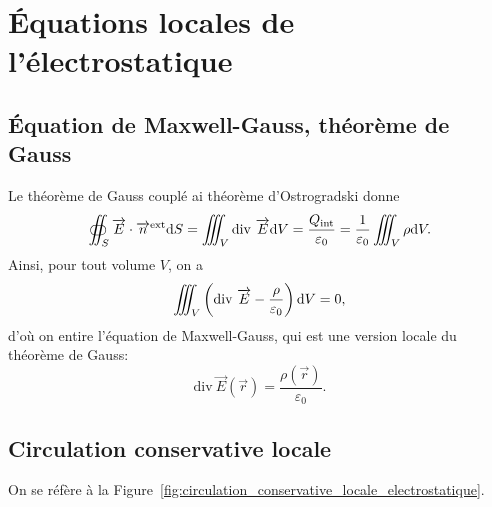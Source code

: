\section{Équations locales de l'électrostatique}

    \subsection{Équation de Maxwell-Gauss, théorème de Gauss}

        Le théorème de Gauss couplé ai théorème d'Ostrogradski donne
        \begin{equation*}
            \oiint_{S}\protect\overrightarrow{{E}}\cdot\protect\overrightarrow{{n}}^{\text{ext}}\mathrm{d} S=\iiint_{V}\mathrm{div}~\protect\overrightarrow{{E}}\mathrm{d} V=\frac{Q_{\text{int}}}{\varepsilon_0}=\frac{1}{\varepsilon_0}\iiint_{V}\rho\mathrm{d} V.
        \end{equation*}
        Ainsi, pour tout volume $V$, on a 
        \begin{equation*}
            \iiint_{V}\left(
                \mathrm{div}~\protect\overrightarrow{{E}}-\frac{\rho}{\varepsilon_0}
            \right)\mathrm{d} V=0,
        \end{equation*}
        d'où on entire l'équation de Maxwell-Gauss, qui est une version locale du théorème de Gauss:
        \begin{equation*}
            \boxed{
                \mathrm{div}~\vec{E}(\vec{r})=\frac{\rho(\vec{r})}{\varepsilon_0}.
            }
        \end{equation*}

    \subsection{Circulation conservative locale}

        On se réfère à la Figure~\ref{fig:circulation_conservative_locale_electrostatique}.

